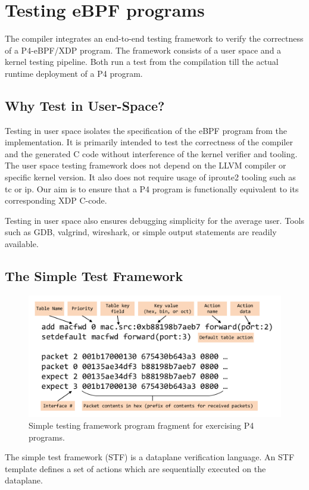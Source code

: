 \section{Testing eBPF programs}\label{sec:testing}
The compiler integrates an end-to-end testing framework to verify the 
correctness of a P4-eBPF/XDP program. The framework consists of a user space 
and a kernel testing pipeline. Both run a test from the compilation 
till the actual runtime deployment of a P4 program.

\subsection{Why Test in User-Space?}
Testing in user space isolates the specification of the eBPF program from the
implementation. It is primarily intended to test the correctness of the
compiler and the generated C code without interference of the kernel verifier
and tooling. The user space testing framework does not depend on the LLVM
compiler or specific kernel version. It also does not require usage of iproute2 
tooling such as tc or ip. Our aim is to ensure that a P4 program is functionally
equivalent to its corresponding XDP C-code.

Testing in user space also ensures debugging simplicity for the average
user. Tools such as GDB, valgrind, wireshark, or simple output statements
are readily available.

\subsection{The Simple Test Framework}
\begin{figure}
	\centering
	\includegraphics[width=\linewidth]{stf}
	\caption{Simple testing framework program fragment for exercising P4 programs.}
	\label{fig:stf}
\end{figure}
The simple test framework (STF) is a dataplane verification language. 
An STF template defines a set of actions which are sequentially executed on the 
dataplane.

